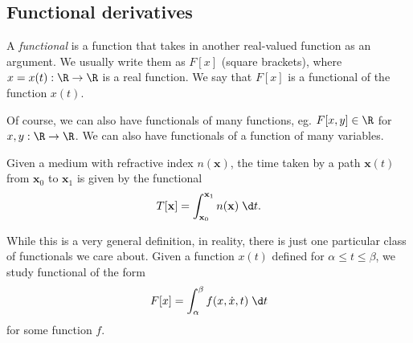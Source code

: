 \documentclass[a4paper]{article}
\begin{document}
\subsection{Functional derivatives}
\begin{defi}[Functional]
  A \emph{functional} is a function that takes in another real-valued function as an argument. We usually write them as $F[x]$ (square brackets), where $x = x(t): \R \to \R$ is a real function. We say that $F[x]$ is a functional of the function $x(t)$.
\end{defi}
Of course, we can also have functionals of many functions, eg. $F[x, y]\in \R$ for $x, y: \R \to \R$. We can also have functionals of a function of many variables.

\begin{eg}
  Given a medium with refractive index $n(\mathbf{x})$, the time taken by a path $\mathbf{x}(t)$ from $\mathbf{x}_0$ to $\mathbf{x}_1$ is given by the functional
  \[
    T[\mathbf{x}] = \int_{\mathbf{x}_0}^{\mathbf{x}_1} n(\mathbf{x}) \;\d t.
  \]
\end{eg}

While this is a very general definition, in reality, there is just one particular class of functionals we care about. Given a function $x(t)$ defined for $\alpha \leq t \leq \beta$, we study functional of the form
\[
  F[x] = \int_\alpha^\beta f(x, \dot{x}, t)\;\d t
\]
for some function $f$.
\end{document}

